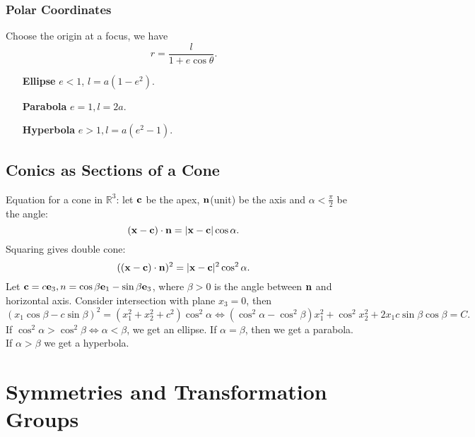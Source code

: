 \documentclass[10pt]{article}
\begin{document}
    \subsubsection{Polar Coordinates}
    Choose the origin at a focus, we have
    \[
        r = \frac{l}{1+e\cos \theta}.
    \]
    \begin{enumerate}[align=hang]
        \item[\bfseries Ellipse] $e<1$, $ l=a(1-e^2) $.
        \item[\bfseries Parabola] $ e=1, l=2a $.
        \item[\bfseries Hyperbola] $ e>1, l=a(e^2-1) $.  
    \end{enumerate}
    \subsection{Conics as Sections of a Cone}
    Equation for a cone in $ \mathbb{R}^{3} $:
    let ${\bf c}$ be the apex, ${\bf n}$(unit) be the axis and $ \alpha<\frac{\pi}{2} $ be the angle:
    \[
        ({\bf x}-{\bf c})\cdot {\bf n}=|{\bf x}-{\bf c}|\cos \alpha.
    \]
    Squaring gives double cone:
    \[
        (({\bf x}-{\bf c})\cdot {\bf n})^2=|{\bf x}-{\bf c}|^2\cos^2 \alpha.
    \]
    Let $ {\bf c}=c{\bf e}_3,n=\cos \beta {\bf e}_1-\sin \beta {\bf e}_3 $, where $ \beta>0 $ is the angle between ${\bf n}$ and horizontal axis. Consider intersection with plane $x_3=0$, then 
    \[
        (x_1 \cos \beta-c \sin \beta)^2=(x_1^2+x_2^2+c^2)\cos^2 \alpha \Longleftrightarrow (\cos^2 \alpha-\cos^2\beta)x_1^2+\cos^2x_2^2+2x_1c \sin \beta \cos \beta = C.
    \]
    If $ \cos^2 \alpha>\cos^2 \beta \Leftrightarrow \alpha<\beta $, we get an ellipse. If $ \alpha=\beta $, then we get a parabola. If $ \alpha>\beta $ we get a hyperbola.
    \section{Symmetries and Transformation Groups}
\end{document}
